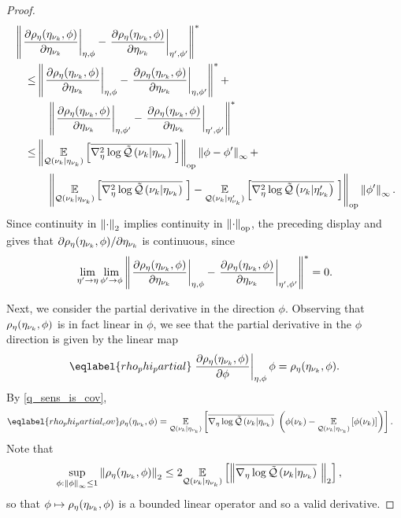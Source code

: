 \begin{proof}
%
\begin{align*}
%
\MoveEqLeft
%
\norm{\fracat{\partial \rho_\eta(\etanuk, \phi)}{\partial \etanuk}{\eta, \phi} -
      \fracat{\partial \rho_\eta(\etanuk, \phi)}{\partial \etanuk}{\eta', \phi'}
      }^* \\ \le
%
& \norm{\fracat{\partial \rho_\eta(\etanuk, \phi)}{\partial \etanuk}{\eta, \phi} -
        \fracat{\partial \rho_\eta(\etanuk, \phi)}{\partial \etanuk}{\eta, \phi'}
    }^* + \\&\quad
\norm{\fracat{\partial \rho_\eta(\etanuk, \phi)}{\partial \etanuk}{\eta, \phi'} -
      \fracat{\partial \rho_\eta(\etanuk, \phi)}{\partial \etanuk}{\eta', \phi'}
    }^* \\ \le
%
& \normop{
    \expect{\q(\nuk \vert \etanuk)}
           {\lqhessbar{\nuk \vert \etanuk}}
    } \norminf{\phi - \phi'} + \\&\quad
\normop{
    \expect{\q(\nuk \vert \etanuk)}{\lqhessbar{\nuk \vert \etanuk}} -
    \expect{\q(\nuk \vert \etanuk')}{\lqhessbar{\nuk \vert \etanuk'}}
  } \norminf{\phi'}.
%
\end{align*}
%
Since continuity in $\left\Vert\cdot\right\Vert_2$ implies continuity in $\left\Vert\cdot\right\Vert_{\mathrm{op}}$,
the preceding display and  gives that
$\partial \rho_\eta(\eta_{\nu_{k}}, \phi) / \partial \eta_{\nu_{k}}$ is continuous,
since
%
\begin{align*}
%
\lim_{\eta' \rightarrow \eta} \lim_{\phi' \rightarrow \phi}
\norm{\fracat{\partial \rho_\eta(\etanuk, \phi)}{\partial \etanuk}{\eta, \phi} -
      \fracat{\partial \rho_\eta(\etanuk, \phi)}{\partial \etanuk}{\eta', \phi'}
      }^* = 0.
%
\end{align*}

Next, we consider the partial derivative in the direction $\phi$.  Observing
that $\rho_\eta(\eta_{\nu_{k}}, \phi)$ is in fact linear in $\phi$, we see that the
partial derivative in the $\phi$ direction is given by the linear map
%
\begin{align}\eqlabel{rho_phi_partial}
%
\fracat{\partial \rho_\eta(\etanuk, \phi)}
       {\partial \phi}{\eta, \phi} \phi =
    \rho_\eta(\etanuk, \phi).
%
\end{align}
%
By  \eqref{q_sens_is_cov},
%
\begin{align}\eqlabel{rho_phi_partial_cov}
%
\rho_\eta(\etanuk, \phi) ={}&
\expect{\q(\nuk \vert \etanuk)}
       {\lqgradbar{\nuk \vert \etanuk} \left(
        \phi(\nuk) - \expect{\q(\nuk \vert \etanuk)}{\phi(\nuk)}
       \right)
       }.
%
\end{align}
%
Note that
%
\begin{align*}
%
\sup_{\phi: \norminf{\phi} \le 1} \norm{\rho_\eta(\etanuk, \phi)}_2 \le{}&
    2 \expect{\q(\nuk \vert \etanuk)}
             {\norm{\lqgradbar{\nuk \vert \etanuk}}_2
             },
%
\end{align*}
%
so that $\phi \mapsto \rho_\eta(\eta_{\nu_{k}}, \phi)$ is a bounded linear operator and
so a valid derivative.


\end{proof}
